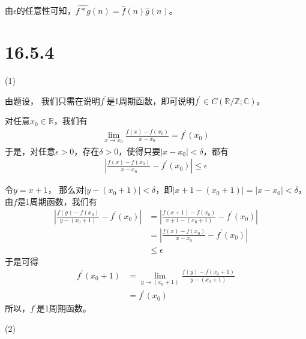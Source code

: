 \documentclass{article}
\begin{document}
\begin{itemize}
        由$\epsilon$的任意性可知，$\widehat{f \ast g}(n) = \hat{f}(n) \hat{g}(n)$。

\end{itemize}

\section*{16.5.4}
 (1)

由题设，
我们只需在说明$f^\prime$是1周期函数，即可说明$f^\prime \in C(\mathbb{R}/\mathbb{Z}; \mathbb{C})$。

对任意$x_0 \in \mathbb{R}$，我们有
\begin{align*}
  \lim\limits_{x \to x_0} \frac{f(x) - f(x_0)}{x - x_0} = f^\prime(x_0)
\end{align*}
于是，对任意$\epsilon > 0$，存在$\delta > 0$，使得只要$|x - x_0| < \delta$，都有
\begin{align*}
  |\frac{f(x) - f(x_0)}{x - x_0} - f^\prime(x_0)| \leq \epsilon
\end{align*}

令$y = x + 1$，
那么对$|y - (x_0 + 1)| < \delta$，即$|x + 1 - (x_0 + 1)| = |x - x_0| < \delta$，
由$f$是1周期函数，我们有
\begin{align*}
  |\frac{f(y) - f(x_0)}{y - (x_0 + 1)} - f^\prime(x_0)|
   & = |\frac{f(x + 1) - f(x_0)}{x + 1 - (x_0 + 1)} - f^\prime(x_0)| \\
   & = |\frac{f(x) - f(x_0)}{x - x_0} - f^\prime(x_0)|               \\
   & \leq \epsilon
\end{align*}
于是可得
\begin{align*}
  f^\prime(x_0 + 1)
   & = \lim\limits_{y \to (x_0 + 1)} \frac{f(y) - f(x_0 + 1)}{y - (x_0 + 1)} \\
   & = f^\prime(x_0)
\end{align*}
所以，$f^\prime$是1周期函数。

(2)
\end{document}
